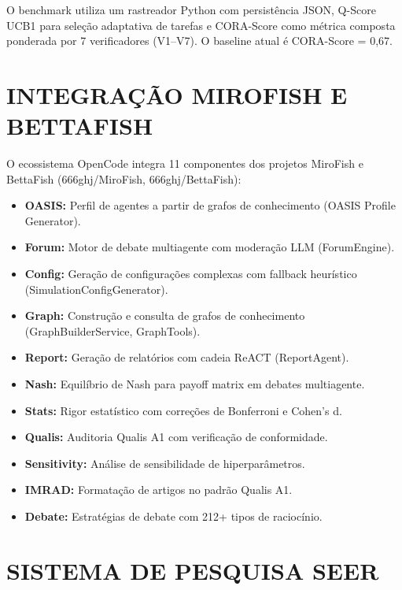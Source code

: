 \documentclass[
  brazil,
  sumario=tradicional,
  10pt
]{abntex2}
\begin{document}
O benchmark utiliza um rastreador Python com persistência JSON,
Q-Score UCB1 para seleção adaptativa de tarefas e CORA-Score como
métrica composta ponderada por 7 verificadores (V1--V7). O baseline
atual é CORA-Score = 0,67.

\section{INTEGRAÇÃO MIROFISH E BETTAFISH}
\label{sec:mirofish}

O ecossistema OpenCode integra 11 componentes dos projetos
MiroFish e BettaFish (666ghj/MiroFish, 666ghj/BettaFish):

\begin{itemize}
  \item \textbf{OASIS:} Perfil de agentes a partir de grafos de
    conhecimento (OASIS Profile Generator).
  \item \textbf{Forum:} Motor de debate multiagente com moderação
    LLM (ForumEngine).
  \item \textbf{Config:} Geração de configurações complexas com
    fallback heurístico (SimulationConfigGenerator).
  \item \textbf{Graph:} Construção e consulta de grafos de
    conhecimento (GraphBuilderService, GraphTools).
  \item \textbf{Report:} Geração de relatórios com cadeia ReACT
    (ReportAgent).
  \item \textbf{Nash:} Equilíbrio de Nash para payoff matrix em
    debates multiagente.
  \item \textbf{Stats:} Rigor estatístico com correções de
    Bonferroni e Cohen's d.
  \item \textbf{Qualis:} Auditoria Qualis A1 com verificação de
    conformidade.
  \item \textbf{Sensitivity:} Análise de sensibilidade de
    hiperparâmetros.
  \item \textbf{IMRAD:} Formatação de artigos no padrão Qualis A1.
  \item \textbf{Debate:} Estratégias de debate com 212+ tipos de
    raciocínio.
\end{itemize}

\section{SISTEMA DE PESQUISA SEER}
\label{sec:seer}
\end{document}
